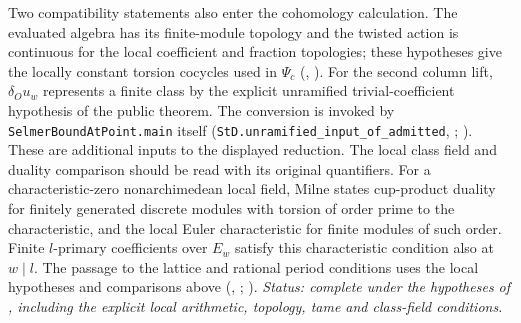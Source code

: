 Two compatibility statements also enter the cohomology calculation.
The evaluated algebra has its finite-module topology and the twisted
action is continuous for the local coefficient and fraction topologies;
these hypotheses give the locally constant torsion cocycles used in
$\Psi_c$ (, ).
For the second column lift, $\delta_O u_w$ represents a finite class
by the explicit unramified trivial-coefficient hypothesis of the public
theorem. The conversion is invoked by \nolinkurl{SelmerBoundAtPoint.main}
itself (\nolinkurl{StD.unramified_input_of_admitted},
;
). These are additional inputs
to the displayed reduction. The local class field and duality comparison should be read with its
original quantifiers. For a characteristic-zero nonarchimedean local
field, Milne states cup-product duality for finitely generated discrete
modules with torsion of order prime to the characteristic, and the local
Euler characteristic for finite modules of such order. Finite
$l$-primary coefficients over $E_w$ satisfy this characteristic condition
also at $w\mid l$. The passage to the lattice and rational period
conditions uses the local hypotheses and comparisons above
(, ;
\cite[I.2, Corollary 2.3 and Theorem 2.8]{S-Milne}).
\emph{Status: complete under the hypotheses of , including the explicit local arithmetic, topology, tame and class-field conditions.}

\clearpage

